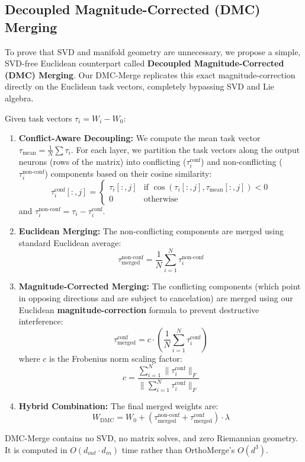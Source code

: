 \documentclass{article}
\begin{document}
\subsection{Decoupled Magnitude-Corrected (DMC) Merging}
To prove that SVD and manifold geometry are unnecessary, we propose a simple, SVD-free Euclidean counterpart called \textbf{Decoupled Magnitude-Corrected (DMC) Merging}. Our DMC-Merge replicates this exact magnitude-correction directly on the Euclidean task vectors, completely bypassing SVD and Lie algebra.

Given task vectors $\tau_i = W_i - W_0$:
\begin{enumerate}
\item \textbf{Conflict-Aware Decoupling:} We compute the mean task vector $\tau_{\text{mean}} = \frac{1}{N} \sum \tau_i$. For each layer, we partition the task vectors along the output neurons (rows of the matrix) into conflicting ($\tau_i^{\text{conf}}$) and non-conflicting ($\tau_i^{\text{non-conf}}$) components based on their cosine similarity:
\begin{equation}
    \tau_i^{\text{conf}}[:, j] = \begin{cases} \tau_i[:, j] & \text{if } \cos(\tau_i[:, j], \tau_{\text{mean}}[:, j]) < 0 \\ 0 & \text{otherwise} \end{cases}
\end{equation}
and $\tau_i^{\text{non-conf}} = \tau_i - \tau_i^{\text{conf}}$.
\item \textbf{Euclidean Merging:} The non-conflicting components are merged using standard Euclidean average:
\begin{equation}
    \tau_{\text{merged}}^{\text{non-conf}} = \frac{1}{N} \sum_{i=1}^N \tau_i^{\text{non-conf}}
\end{equation}
\item \textbf{Magnitude-Corrected Merging:} The conflicting components (which point in opposing directions and are subject to cancelation) are merged using our Euclidean \textbf{magnitude-correction} formula to prevent destructive interference:
\begin{equation}
    \tau_{\text{merged}}^{\text{conf}} = c \cdot \left(\frac{1}{N} \sum_{i=1}^N \tau_i^{\text{conf}}\right)
\end{equation}
where $c$ is the Frobenius norm scaling factor:
\begin{equation}
    c = \frac{\sum_{i=1}^N \|\tau_i^{\text{conf}}\|_F}{\|\sum_{i=1}^N \tau_i^{\text{conf}}\|_F}
\end{equation}
\item \textbf{Hybrid Combination:} The final merged weights are:
\begin{equation}
    W_{\text{DMC}} = W_0 + \left(\tau_{\text{merged}}^{\text{non-conf}} + \tau_{\text{merged}}^{\text{conf}}\right) \cdot \lambda
\end{equation}
\end{enumerate}
DMC-Merge contains no SVD, no matrix solves, and zero Riemannian geometry. It is computed in $O(d_{out} \cdot d_{in})$ time rather than OrthoMerge's $O(d^3)$.
\end{document}
